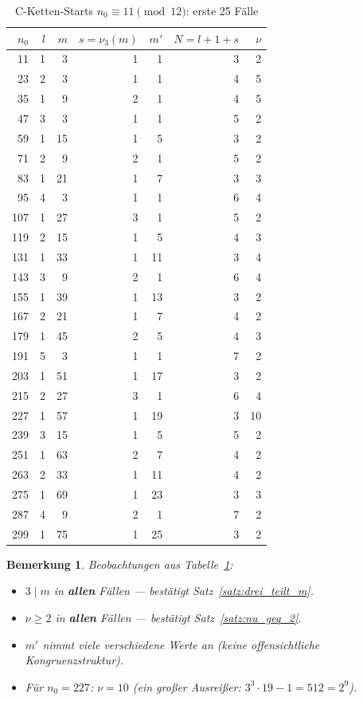 \documentclass[12pt,a4paper]{article}
\newtheorem{bemerkung}[definition]{Bemerkung}
\newcommand{\viii}{\nu_3}
\begin{document}
\begin{table}[h!]
\centering
\caption{C-Ketten-Starts $n_0 \equiv 11 \pmod{12}$: erste 25 Fälle}
\label{tab:erste_faelle}
\renewcommand{\arraystretch}{1.25}
\begin{tabular}{r r r r r r r}
\toprule
$n_0$ & $l$ & $m$ & $s=\viii(m)$ & $m'$ & $N=l{+}1{+}s$ & $\nu$ \\
\midrule
  11 & 1 &  3 & 1 &  1 & 3 &  2 \\
  23 & 2 &  3 & 1 &  1 & 4 &  5 \\
  35 & 1 &  9 & 2 &  1 & 4 &  5 \\
  47 & 3 &  3 & 1 &  1 & 5 &  2 \\
  59 & 1 & 15 & 1 &  5 & 3 &  2 \\
  71 & 2 &  9 & 2 &  1 & 5 &  2 \\
  83 & 1 & 21 & 1 &  7 & 3 &  3 \\
  95 & 4 &  3 & 1 &  1 & 6 &  4 \\
 107 & 1 & 27 & 3 &  1 & 5 &  2 \\
 119 & 2 & 15 & 1 &  5 & 4 &  3 \\
 131 & 1 & 33 & 1 & 11 & 3 &  4 \\
 143 & 3 &  9 & 2 &  1 & 6 &  4 \\
 155 & 1 & 39 & 1 & 13 & 3 &  2 \\
 167 & 2 & 21 & 1 &  7 & 4 &  2 \\
 179 & 1 & 45 & 2 &  5 & 4 &  3 \\
 191 & 5 &  3 & 1 &  1 & 7 &  2 \\
 203 & 1 & 51 & 1 & 17 & 3 &  2 \\
 215 & 2 & 27 & 3 &  1 & 6 &  4 \\
 227 & 1 & 57 & 1 & 19 & 3 & 10 \\
 239 & 3 & 15 & 1 &  5 & 5 &  2 \\
 251 & 1 & 63 & 2 &  7 & 4 &  2 \\
 263 & 2 & 33 & 1 & 11 & 4 &  2 \\
 275 & 1 & 69 & 1 & 23 & 3 &  3 \\
 287 & 4 &  9 & 2 &  1 & 7 &  2 \\
 299 & 1 & 75 & 1 & 25 & 3 &  2 \\
\bottomrule
\end{tabular}
\end{table}

\begin{bemerkung}
Beobachtungen aus Tabelle~\ref{tab:erste_faelle}:
\begin{itemize}[noitemsep]
  \item $3 \mid m$ in \textbf{allen} Fällen --- bestätigt Satz~\ref{satz:drei_teilt_m}.
  \item $\nu \geq 2$ in \textbf{allen} Fällen --- bestätigt Satz~\ref{satz:nu_geq_2}.
  \item $m'$ nimmt viele verschiedene Werte an (keine offensichtliche Kongruenzstruktur).
  \item Für $n_0 = 227$: $\nu = 10$ (ein großer Ausreißer: $3^3 \cdot 19 - 1 = 512 = 2^9$).
\end{itemize}
\end{bemerkung}
\end{document}
